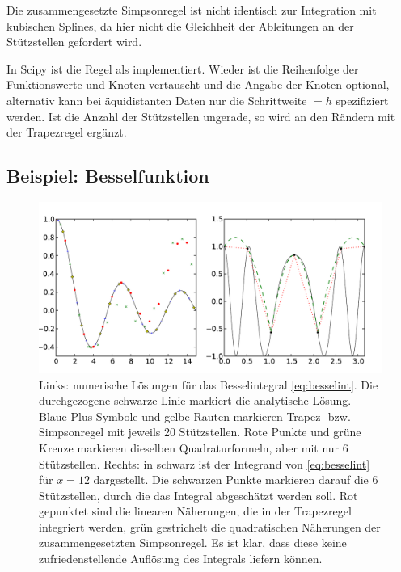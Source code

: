 Die zusammengesetzte Simpsonregel ist nicht identisch zur Integration
mit kubischen Splines, da hier nicht die Gleichheit der Ableitungen an
der Stützstellen gefordert wird.

In Scipy ist die Regel als 
implementiert. Wieder ist die Reihenfolge der Funktionswerte 
und Knoten  vertauscht und die Angabe der Knoten optional,
alternativ kann bei äquidistanten Daten nur die Schrittweite
$=h$ spezifiziert werden. Ist die Anzahl der Stützstellen
ungerade, so wird an den Rändern mit der Trapezregel ergänzt.

\subsection{Beispiel: Besselfunktion}

\begin{figure}
  \centering
  \includegraphics[width=\textwidth]{plots/bessel_int}
  \caption{Links: numerische Lösungen für das Besselintegral
    \eqref{eq:besselint}. Die durchgezogene schwarze Linie markiert
    die analytische Lösung. Blaue Plus-Symbole und gelbe Rauten
    markieren Trapez- bzw. Simpsonregel mit jeweils 20 Stützstellen.
    Rote Punkte und grüne Kreuze markieren dieselben Quadraturformeln,
    aber mit nur 6 Stützstellen. Rechts: in schwarz ist der Integrand
    von \eqref{eq:besselint} für $x=12$ dargestellt. Die schwarzen
    Punkte markieren darauf die 6 Stützstellen, durch die das Integral
    abgeschätzt werden soll. Rot gepunktet sind die linearen
    Näherungen, die in der Trapezregel integriert werden, grün
    gestrichelt die quadratischen Näherungen der zusammengesetzten
    Simpsonregel. Es ist klar, dass diese keine zufriedenstellende
    Auflösung des Integrals liefern können.}
  \label{fig:bessel_int}
\end{figure}

